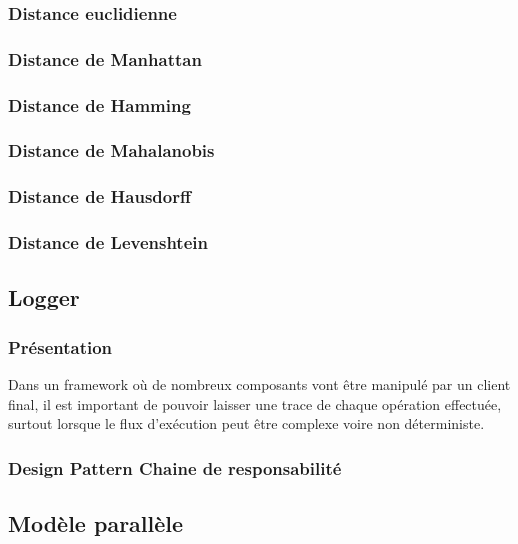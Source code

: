 \subsubsection{Distance euclidienne}
\subsubsection{Distance de Manhattan}
\subsubsection{Distance de Hamming}
\subsubsection{Distance de Mahalanobis}
\subsubsection{Distance de Hausdorff}
\subsubsection{Distance de Levenshtein}

%
\subsection{Logger}
\subsubsection{Présentation}
Dans un framework où de nombreux composants vont être manipulé par un client final, il est important de pouvoir laisser une trace de chaque opération effectuée, surtout lorsque le flux d'exécution peut être complexe voire non déterministe.
\subsubsection{Design Pattern Chaine de responsabilité}

\subsection{Modèle parallèle}

